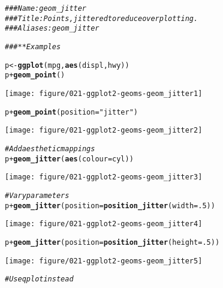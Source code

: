 \documentclass[a4paper,titlepage]{tufte-handout}\usepackage[]{graphicx}\usepackage[]{color}
\makeatletter
\def\maxwidth{ %
  \ifdim\Gin@nat@width>\linewidth
    \linewidth
  \else
    \Gin@nat@width
  \fi
}
\newcommand{\hlnum}[1]{\textcolor[rgb]{0.686,0.059,0.569}{#1}}%
\newcommand{\hlstr}[1]{\textcolor[rgb]{0.192,0.494,0.8}{#1}}%
\newcommand{\hlcom}[1]{\textcolor[rgb]{0.678,0.584,0.686}{\textit{#1}}}%
\newcommand{\hlopt}[1]{\textcolor[rgb]{0,0,0}{#1}}%
\newcommand{\hlstd}[1]{\textcolor[rgb]{0.345,0.345,0.345}{#1}}%
\newcommand{\hlkwb}[1]{\textcolor[rgb]{0.69,0.353,0.396}{#1}}%
\newcommand{\hlkwc}[1]{\textcolor[rgb]{0.333,0.667,0.333}{#1}}%
\newcommand{\hlkwd}[1]{\textcolor[rgb]{0.737,0.353,0.396}{\textbf{#1}}}%
\newenvironment{kframe}{%
 \def\at@end@of@kframe{}%
 \ifinner\ifhmode%
  \def\at@end@of@kframe{\end{minipage}}%
  \begin{minipage}{\columnwidth}%
 \fi\fi%
 \def\FrameCommand##1{\hskip\@totalleftmargin \hskip-\fboxsep
 \colorbox{shadecolor}{##1}\hskip-\fboxsep
     \hskip-\linewidth \hskip-\@totalleftmargin \hskip\columnwidth}%
 \MakeFramed {\advance\hsize-\width
   \@totalleftmargin\z@ \linewidth\hsize
   \@setminipage}}%
 {\par\unskip\endMakeFramed%
 \at@end@of@kframe}
\newenvironment{knitrout}{}{} %
\makeatother
\begin{document}
\begin{knitrout}
\color{fgcolor}\begin{kframe}
\begin{alltt}
\hlcom{### Name: geom_jitter}
\hlcom{### Title: Points, jittered to reduce overplotting.}
\hlcom{### Aliases: geom_jitter}

\hlcom{### ** Examples}

\hlstd{p} \hlkwb{<-} \hlkwd{ggplot}\hlstd{(mpg,} \hlkwd{aes}\hlstd{(displ, hwy))}
\hlstd{p} \hlopt{+} \hlkwd{geom_point}\hlstd{()}
\end{alltt}
\end{kframe}
\texttt{[image: figure/021-ggplot2-geoms-geom\_jitter1]} 
\begin{kframe}\begin{alltt}
\hlstd{p} \hlopt{+} \hlkwd{geom_point}\hlstd{(}\hlkwc{position} \hlstd{=} \hlstr{"jitter"}\hlstd{)}
\end{alltt}
\end{kframe}
\texttt{[image: figure/021-ggplot2-geoms-geom\_jitter2]} 
\begin{kframe}\begin{alltt}
\hlcom{# Add aesthetic mappings}
\hlstd{p} \hlopt{+} \hlkwd{geom_jitter}\hlstd{(}\hlkwd{aes}\hlstd{(}\hlkwc{colour} \hlstd{= cyl))}
\end{alltt}
\end{kframe}
\texttt{[image: figure/021-ggplot2-geoms-geom\_jitter3]} 
\begin{kframe}\begin{alltt}
\hlcom{# Vary parameters}
\hlstd{p} \hlopt{+} \hlkwd{geom_jitter}\hlstd{(}\hlkwc{position} \hlstd{=} \hlkwd{position_jitter}\hlstd{(}\hlkwc{width} \hlstd{=} \hlnum{.5}\hlstd{))}
\end{alltt}
\end{kframe}
\texttt{[image: figure/021-ggplot2-geoms-geom\_jitter4]} 
\begin{kframe}\begin{alltt}
\hlstd{p} \hlopt{+} \hlkwd{geom_jitter}\hlstd{(}\hlkwc{position} \hlstd{=} \hlkwd{position_jitter}\hlstd{(}\hlkwc{height} \hlstd{=} \hlnum{.5}\hlstd{))}
\end{alltt}
\end{kframe}
\texttt{[image: figure/021-ggplot2-geoms-geom\_jitter5]} 
\begin{kframe}\begin{alltt}
\hlcom{# Use qplot instead}

\end{alltt}
\end{kframe}
\end{knitrout}
\end{document}
